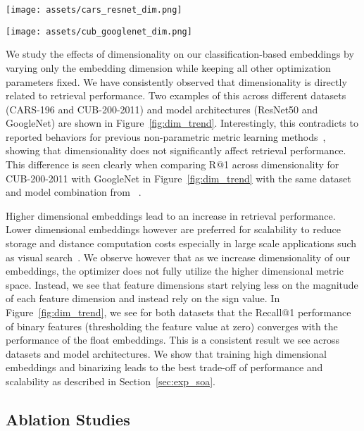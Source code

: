 \documentclass{bmvc2k}
\begin{document}
\label{sec:exp_dimension}




\begin{figure*}
\centering
\begin{minipage}{.45\textwidth}
  \centering
  \texttt{[image: assets/cars\_resnet\_dim.png]}
  \end{minipage}\begin{minipage}{.45\textwidth}
  \centering
  \texttt{[image: assets/cub\_googlenet\_dim.png]}
  \end{minipage}
   \caption{Recall@1 for CARS-196 (left) and CUB-200-2011 (right) across varying embedding dimensions. Softmax based embeddings improve performance when increasing dimensionality. The performance gap between float and binary embeddings converge when increasing dimensionality, showing that when given enough representational freedom, Softmax learns bit like features.}
   \label{fig:dim_trend}

\end{figure*}

We study the effects of dimensionality on our classification-based embeddings by varying only the embedding dimension while keeping all other optimization parameters fixed. We have consistently observed that dimensionality is directly related to retrieval performance. Two examples of this across different datasets (CARS-196 and CUB-200-2011) and model architectures (ResNet50 and GoogleNet) are shown in Figure~\ref{fig:dim_trend}. Interestingly, this contradicts to reported behaviors for previous non-parametric metric learning methods~\cite{angular,songCVPR16,songCVPR17}, showing that dimensionality does not significantly affect retrieval performance. This difference is seen clearly when comparing R@1 across dimensionality for CUB-200-2011 with GoogleNet in Figure~\ref{fig:dim_trend} with the same dataset and model combination from ~\cite{songCVPR16}.

Higher dimensional embeddings lead to an increase in retrieval performance. Lower dimensional embeddings however are preferred for scalability to reduce storage and distance computation costs especially in large scale applications such as visual search~\cite{jing15}. We observe however that as we increase dimensionality of our embeddings, the optimizer does not fully utilize the higher dimensional metric space. Instead, we see that feature dimensions start relying less on the magnitude of each feature dimension and instead rely on the sign value. In Figure~\ref{fig:dim_trend}, we see for both datasets that the Recall@1 performance of binary features (thresholding the feature value at zero) converges with the performance of the float embeddings. This is a consistent result we see across datasets and model architectures. We show that training high dimensional embeddings and binarizing leads to the best trade-off of performance and scalability as described in Section~\ref{sec:exp_soa}. \subsection{Ablation Studies}
\label{sec:ablation}
\end{document}

